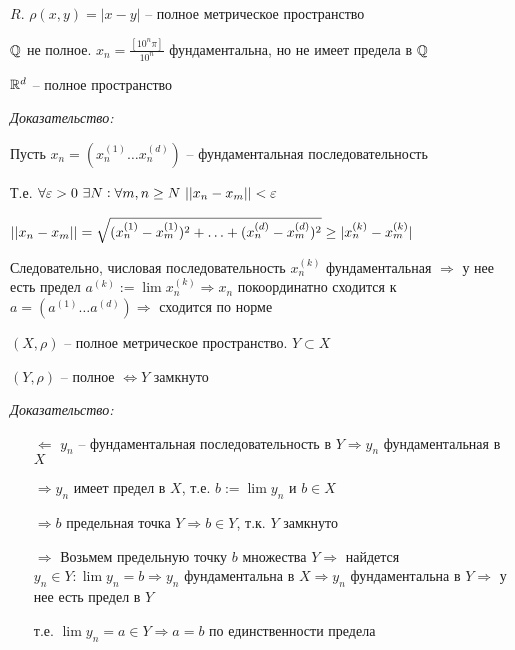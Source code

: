 \documentclass[12pt]{article}
\begin{document}
\begin{Example}{}
    $R$. $\rho(x, y) = |x - y|$ -- полное метрическое пространство

    $\mathbb Q$ не полное. $x_n = \frac{[10^n\pi]}{10^n}$ фундаментальна, но не имеет предела в $\mathbb Q$
\end{Example}

\begin{theo}{}
    $\mathbb R^d$ -- полное пространство
\end{theo}

\textit{Доказательство:}

Пусть $x_n = (x_n^{(1)} \ldots x_n^{(d)})$ -- фундаментальная последовательность

Т.е. $\forall \varepsilon > 0\ \exists N : \forall m, n \geq N\ || x_n - x_m || < \varepsilon$

$|| x_n - x_m || = \sqrt{(x_n^{(1)} - x_m^{(1)})^2 + \ldots + (x_n^{(d)} - x_m^{(d)})^2} \geq |x_n^{(k)} - x_m^{(k)}|$

Следовательно, числовая последовательность $x_n^{(k)}$ фундаментальная $\Rightarrow$ у нее есть предел $a^{(k)} := \lim x_n^{(k)} \Rightarrow x_n$ покоординатно сходится к $a = (a^{(1)} \ldots a^{(d)}) \Rightarrow$ сходится по норме

\begin{Remark}{}
    $(X, \rho)$ -- полное метрическое пространство. $Y \subset X$

    $(Y, \rho)$ -- полное $\Leftrightarrow Y$ замкнуто 
\end{Remark}

\textit{Доказательство:}

\begin{itemize}
    \item[$\Leftarrow$] $y_n$ -- фундаментальная последовательность в $Y \Rightarrow y_n$ фундаментальная в $X$
    
    $\Rightarrow y_n$ имеет предел в $X$, т.е. $b := \lim y_n$ и $b \in X$
    
    $\Rightarrow b$ предельная точка $Y \Rightarrow b \in Y$, т.к. $Y$ замкнуто

    \item[$\Rightarrow$] Возьмем предельную точку $b$ множества $Y \Rightarrow$ найдется $y_n \in Y : \lim y_n = b \Rightarrow y_n$ фундаментальна в $X \Rightarrow y_n$ фундаментальна в $Y \Rightarrow$ у нее есть предел в $Y$
    
    т.е. $\lim y_n = a \in Y \Rightarrow a = b$ по единственности предела
\end{itemize}
\end{document}
